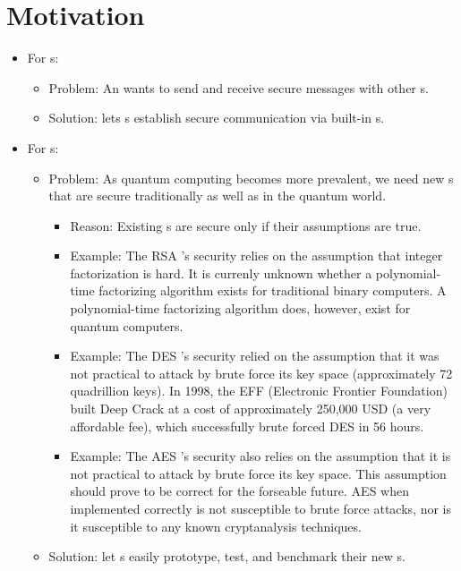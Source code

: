 
\section{Motivation}

\begin{itemize}
\item For \eu s:
  \begin{itemize}
  \item Problem: An \eu{} wants to send and receive
    secure messages with other \eu s.
  \item Solution: \cry{} lets \eu s establish
    secure communication via built-in \cs s.
  \end{itemize}
\item For \cg s:
  \begin{itemize}
  \item Problem: As quantum computing becomes more prevalent,
    we need new \cs s that are secure traditionally
    as well as in the quantum world.
    \begin{itemize}
    \item Reason: Existing \cs s are secure
      only if their assumptions are true.
    \item Example: The RSA \cs's security relies on
      the assumption that integer factorization is hard.
      It is currenly unknown whether a polynomial-time
      factorizing algorithm exists for traditional binary
      computers. A polynomial-time factorizing algorithm
      does, however, exist for quantum computers.
    \item Example: The DES \cs's security relied on the assumption
      that it was not practical to attack by brute force its key space
      (approximately 72 quadrillion keys). In 1998, the EFF (Electronic
      Frontier Foundation) built Deep Crack at a cost of approximately
      250,000 USD (a very affordable fee), which successfully brute
      forced DES in 56 hours.
    \item Example: The AES \cs's security also relies on the assumption
      that it is not practical to attack by brute force its key space.
      This assumption should prove to be correct for the forseable future.
      AES when implemented correctly is not susceptible to
      brute force attacks,
      nor is it susceptible to any known cryptanalysis techniques.
    \end{itemize}
  \item Solution: \cry{} let \cg s easily prototype, test,
    and benchmark their new \cs s.
  \end{itemize}
\end{itemize}
